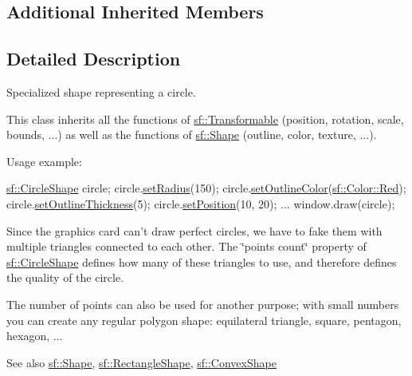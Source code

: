 \subsection*{Additional Inherited Members}


\subsection{Detailed Description}
Specialized shape representing a circle. 

This class inherits all the functions of \hyperlink{classsf_1_1_transformable}{sf\+::\+Transformable} (position, rotation, scale, bounds, ...) as well as the functions of \hyperlink{classsf_1_1_shape}{sf\+::\+Shape} (outline, color, texture, ...).

Usage example\+: 
\begin{DoxyCode}
\hyperlink{classsf_1_1_circle_shape}{sf::CircleShape} circle;
circle.\hyperlink{classsf_1_1_circle_shape_a21cdf85fc2f201e10222a241af864be0}{setRadius}(150);
circle.\hyperlink{classsf_1_1_shape_a5978f41ee349ac3c52942996dcb184f7}{setOutlineColor}(\hyperlink{classsf_1_1_color_a127dbf55db9c07d0fa8f4bfcbb97594a}{sf::Color::Red});
circle.\hyperlink{classsf_1_1_shape_a5ad336ad74fc1f567fce3b7e44cf87dc}{setOutlineThickness}(5);
circle.\hyperlink{classsf_1_1_transformable_a4dbfb1a7c80688b0b4c477d706550208}{setPosition}(10, 20);
...
window.draw(circle);
\end{DoxyCode}


Since the graphics card can't draw perfect circles, we have to fake them with multiple triangles connected to each other. The \char`\"{}points count\char`\"{} property of \hyperlink{classsf_1_1_circle_shape}{sf\+::\+Circle\+Shape} defines how many of these triangles to use, and therefore defines the quality of the circle.

The number of points can also be used for another purpose; with small numbers you can create any regular polygon shape\+: equilateral triangle, square, pentagon, hexagon, ...

\begin{DoxySeeAlso}{See also}
\hyperlink{classsf_1_1_shape}{sf\+::\+Shape}, \hyperlink{classsf_1_1_rectangle_shape}{sf\+::\+Rectangle\+Shape}, \hyperlink{classsf_1_1_convex_shape}{sf\+::\+Convex\+Shape} 
\end{DoxySeeAlso}


